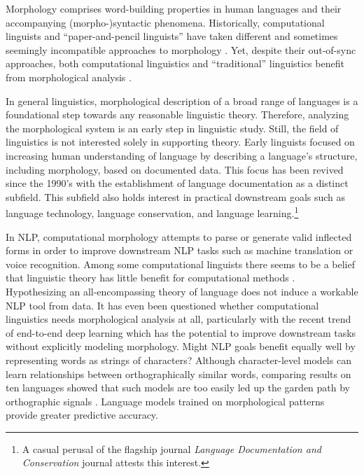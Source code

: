\documentclass[12pt]{article}
\begin{document}
Morphology comprises word-building properties in human languages and their accompanying (morpho-)syntactic phenomena. Historically, computational linguists and ``paper-and-pencil linguists'' have taken different and sometimes seemingly incompatible approaches to morphology \cite{karttunen_2005}.  Yet, despite their out-of-sync approaches, both computational linguistics and ``traditional'' linguistics benefit from morphological analysis \cite[page 165]{cotterell_labeled_2015}. 

In general linguistics, morphological description of a broad range of languages is a foundational step towards any reasonable linguistic theory. Therefore, analyzing the morphological system is an early step in linguistic study. Still, the field of linguistics is not interested solely in supporting theory. Early linguists focused on increasing human understanding of language by describing a language's structure, including morphology, based on documented data. This focus has been revived since the 1990's with the establishment of language documentation as a distinct subfield. This subfield also holds interest in practical downstream goals such as language technology, language conservation, and language learning.\footnote{A casual perusal of the flagship journal \textit{Language Documentation and Conservation} journal attests this interest.}

In NLP, computational morphology attempts to parse or generate valid inflected forms in order to improve downstream NLP tasks such as machine translation or voice recognition. Among some computational linguists there seems to be a belief that linguistic theory has little benefit for computational methods \cite{goldsmith_computational_2017}. Hypothesizing an all-encompassing theory of language does not induce a workable NLP tool from data. It has even been questioned whether computational linguistics needs morphological analysis at all, particularly with the recent trend of end-to-end deep learning which has the potential to improve downstream tasks without explicitly modeling morphology. Might NLP goals benefit equally well by representing words as strings of characters? Although character-level models can learn relationships between orthographically similar words, comparing results on ten languages showed that such models are too easily led up the garden path by orthographic signals \cite{vania_characters_2017}. Language models trained on morphological patterns provide greater predictive accuracy.  
\end{document}
